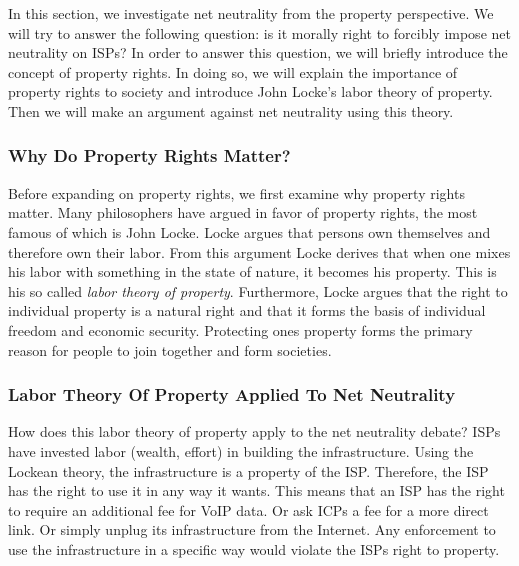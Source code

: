 
In this section, we investigate net neutrality from the property perspective. We will try to answer the following question: is it morally right to forcibly impose net neutrality on \acp{ISP}? In order to answer this question, we will briefly introduce the concept of property rights. In doing so, we will explain the importance of property rights to society and introduce John Locke's labor theory of property. Then we will make an argument against net neutrality using this theory.

\subsubsection{Why Do Property Rights Matter?}
Before expanding on property rights, we first examine why property rights matter. Many philosophers have argued in favor of property rights, the most famous of which is John Locke. Locke argues that persons own themselves and therefore own their labor. From this argument Locke derives that when one mixes his labor with something in the state of nature, it becomes his property. This is his so called \emph{labor theory of property}. Furthermore, Locke argues that the right to individual property is a natural right and that it forms the basis of individual freedom and economic security. Protecting ones property forms the primary reason for people to join together and form societies.

\subsubsection{Labor Theory Of Property Applied To Net Neutrality}
How does this labor theory of property apply to the net neutrality debate? \acp{ISP} have invested labor (wealth, effort) in building the infrastructure. Using the Lockean theory, the infrastructure is a property of the \ac{ISP}. Therefore, the \ac{ISP} has the right to use it in any way it wants. This means that an \ac{ISP} has the right to require an additional fee for \ac{VoIP} data. Or ask ICPs a fee for a more direct link. Or simply unplug its infrastructure from the Internet. Any enforcement to use the infrastructure in a specific way would violate the \acp{ISP} right to property.

